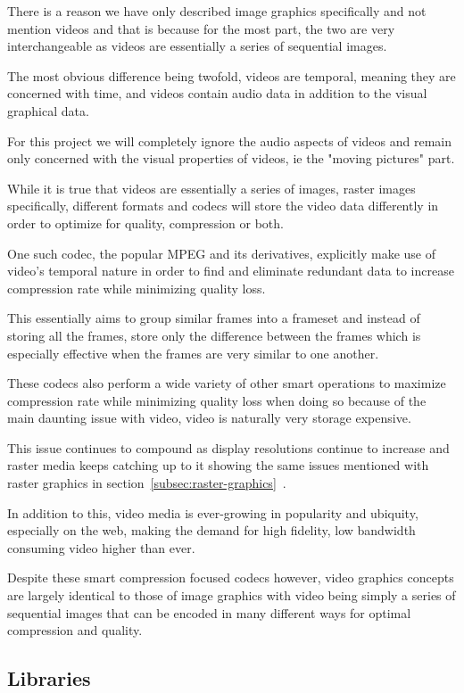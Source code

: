 \documentclass[12pt]{article}
\newcommand{\sentence}{} %
\newcommand{\fullref}[1]{\ref{#1}~\nameref{#1}}
\begin{document}
    \tab
    There is a reason we have only described image graphics specifically and not mention videos and
    that is because for the most part, the two are very interchangeable as videos are essentially a series of
    sequential images.
    \sentence
    The most obvious difference being twofold, videos are temporal, meaning they are concerned with time, and videos
    contain audio data in addition to the visual graphical data.
    \sentence
    For this project we will completely ignore the audio aspects of videos and remain only concerned with the visual
    properties of videos, ie the "moving pictures" part.
    \sentence
    While it is true that videos are essentially a series of images, raster images specifically, different formats
    and codecs will store the video data differently in order to optimize for quality, compression or both.
    \sentence
    One such codec, the popular MPEG and its derivatives, explicitly make use of video's temporal nature in order to
    find and eliminate redundant data to increase compression rate while minimizing quality loss.
    \sentence
    This essentially aims to group similar frames into a frameset and instead of storing all the frames, store only
    the difference between the frames which is especially effective when the frames are very similar to one another.
    \sentence
    These codecs also perform a wide variety of other smart operations to maximize compression rate while minimizing
    quality loss when doing so because of the main daunting issue with video, video is naturally very storage expensive.
    \sentence
    This issue continues to compound as display resolutions continue to increase and raster media keeps catching up
    to it showing the same issues mentioned with raster graphics in section~\fullref{subsec:raster-graphics}.
    \sentence
    In addition to this, video media is ever-growing in popularity and ubiquity, especially on the web, making the
    demand for high fidelity, low bandwidth consuming video higher than ever.
    \sentence
    Despite these smart compression focused codecs however, video graphics concepts are largely identical to those of
    image graphics with video being simply a series of sequential images that can be encoded in many different ways
    for optimal compression and quality.

    \subsection{Libraries}\label{subsec:libraries}
\end{document}
